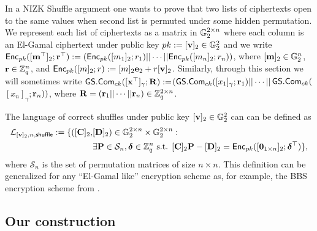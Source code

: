 In a NIZK Shuffle argument one wants to prove that two lists of ciphertexts open to the same values when second list is permuted under some hidden permutation.
We represent each list of ciphertexts as a matrix in $\mathbb{G}_2^{2\times n}$ where each column is an El-Gamal ciphertext under public key $pk:=[\mathbf{v}]_2\in\mathbb{G}^2_2$ and we write $\mathsf{Enc}_{pk}([\mathbf{m}^\top]_2;\mathbf{r}^\top):=(\mathsf{Enc}_{pk}([m_1]_2;r_1)||\cdots||\mathsf{Enc}_{pk}([m_n]_2;r_n))$, where $[\mathbf{m}]_2\in\mathbb{G}_2^n$, $\mathbf{r}\in\mathbb{Z}_q^n$, and $\mathsf{Enc}_{pk}([m]_2;r):=[m]_2\mathbf{e}_2+r[\mathbf{v}]_2$. Similarly, through this section we will sometimes write ${\mathsf{GS}}.\mathsf{Com}_{ck}([\mathbf{x}^\top]_\gamma;\mathbf{{R}}):=$\-$({\mathsf{GS}}.\mathsf{Com}_{ck}([x_1]_\gamma;\mathbf{r}_1)||\cdots||$${\mathsf{GS}}.\mathsf{Com}_{ck}($$[x_n]_\gamma;$$\mathbf{r}_n))$, where $\mathbf{{R}}=(\mathbf{r}_1||\cdots||\mathbf{r}_n)\in\mathbb{Z}_q^{2\times n}$.

The language of correct shuffles under public key $[\mathbf{v}]_2\in\mathbb{G}^2_2$ can can be defined as 
\begin{align*}
\mathcal{L}_{[\mathbf{v}]_2,n,\mathsf{shuffle}}:=\{([\mathbf{{C}}]_2,&[\mathbf{{D}}]_2)\in\mathbb{G}_2^{2\times n}\times \mathbb{G}_2^{2\times n} :\\
                                                         &\exists \mathbf{{P}}\in\mathcal{S}_n,{\boldsymbol \delta}\in\mathbb{Z}_q^n \text{ s.t. } {[\mathbf{{C}}]_2\mathbf{{P}}-[\mathbf{{D}}]_2 = \mathsf{Enc}_{pk}([\mathbf{0}_{1\times n}]_2;{\boldsymbol \delta}^\top)}\},
\end{align*}
where $\mathcal{S}_n$ is the set of permutation matrices of size $n\times n$. This definition can be generalized for any ``El-Gamal like'' encryption scheme as, for example, the BBS encryption scheme from \cite{C:BonBoySha04}.

 
\subsection{Our construction}

